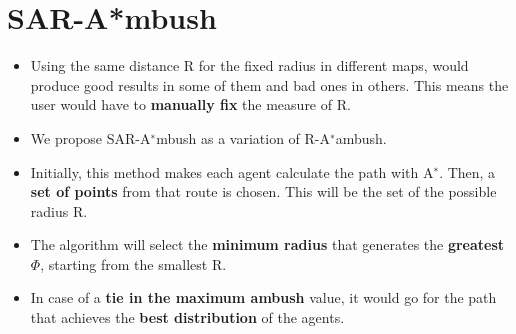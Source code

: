 \begin{minipage}{0.3\textwidth}
\section*{SAR-A*mbush}

\begin{itemize}
\item Using the same distance R for the fixed radius in
different maps, would produce good results in some of them
and bad ones in others. This means the user would have to
\textbf{manually fix} the measure of R.

\item We propose SAR-A$^∗$mbush as a variation of
R-A$^∗$ambush.

\item Initially, this method makes each agent calculate the
path with A$^∗$. Then, a \textbf{set of points} from that route is chosen.
This will be the set of the possible radius R.

\item The algorithm will select the \textbf{minimum radius} that
generates the \textbf{greatest} $\Phi$, starting
from the smallest R.

\item In case of a \textbf{tie in the maximum ambush} value, it would go
for the path that achieves the \textbf{best distribution} of the agents.

\end{itemize}
\end{minipage}